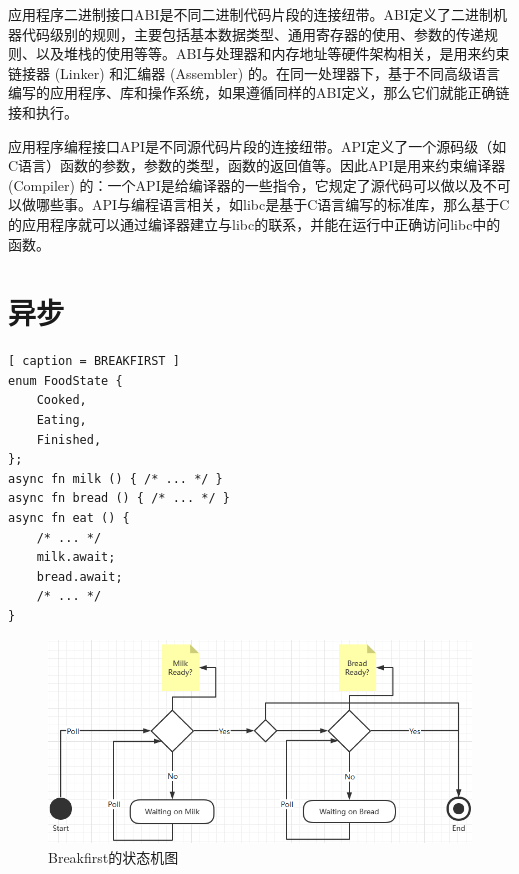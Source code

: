 应用程序二进制接口ABI是不同二进制代码片段的连接纽带。ABI定义了二进制机器代码级别的规则，主要包括基本数据类型、通用寄存器的使用、参数的传递规则、以及堆栈的使用等等。ABI与处理器和内存地址等硬件架构相关，是用来约束链接器 (Linker) 和汇编器 (Assembler) 的。在同一处理器下，基于不同高级语言编写的应用程序、库和操作系统，如果遵循同样的ABI定义，那么它们就能正确链接和执行。

应用程序编程接口API是不同源代码片段的连接纽带。API定义了一个源码级（如C语言）函数的参数，参数的类型，函数的返回值等。因此API是用来约束编译器 (Compiler) 的：一个API是给编译器的一些指令，它规定了源代码可以做以及不可以做哪些事。API与编程语言相关，如libc是基于C语言编写的标准库，那么基于C的应用程序就可以通过编译器建立与libc的联系，并能在运行中正确访问libc中的函数。


\section{异步}

\begin{lstlisting}[ caption = BREAKFIRST ]
enum FoodState {
    Cooked,
    Eating,
    Finished,
};
async fn milk () { /* ... */ }
async fn bread () { /* ... */ }
async fn eat () {
    /* ... */
    milk.await;
    bread.await;
    /* ... */
}

\end{lstlisting}



\begin{figure}[htb]
    \figureCapSet
    \centering
    \includegraphics[width=.8\linewidth]{figure/c2/breakfirststate.png}
    \caption{Breakfirst的状态机图}
    \label{figure:c2breakfirststate}
\end{figure}


